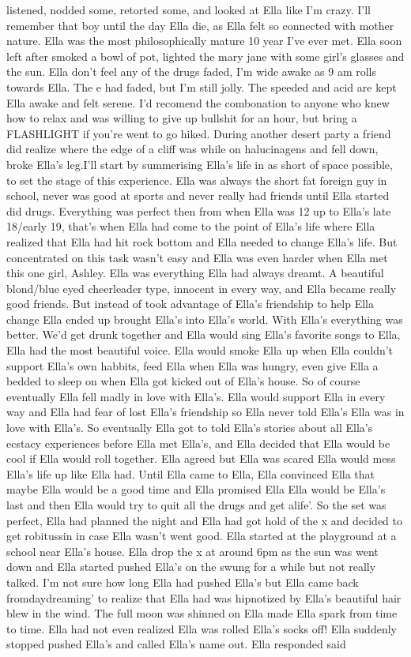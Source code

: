 \documentclass[12pt]{book}
\begin{document}
listened, nodded some, retorted some, and looked at Ella like I'm crazy. I'll remember that boy until the day Ella die, as Ella felt so connected with mother nature. Ella was the most philosophically mature 10 year I've ever met. Ella soon left after smoked a bowl of pot, lighted the mary jane with some girl's glasses and the sun. Ella don't feel any of the drugs faded, I'm wide awake as 9 am rolls towards Ella. The e had faded, but I'm still jolly. The speeded and acid are kept Ella awake and felt serene. I'd recomend the combonation to anyone who knew how to relax and was willing to give up bullshit for an hour, but bring a FLASHLIGHT if you're went to go hiked. During another desert party a friend did realize where the edge of a cliff was while on halucinagens and fell down, broke Ella's leg.I'll start by summerising Ella's life in as short of space possible, to set the stage of this experience. Ella was always the short fat foreign guy in school, never was good at sports and never really had friends until Ella started did drugs. Everything was perfect then from when Ella was 12 up to Ella's late 18/early 19, that's when Ella had come to the point of Ella's life where Ella realized that Ella had hit rock bottom and Ella needed to change Ella's life. But concentrated on this task wasn't easy and Ella was even harder when Ella met this one girl, Ashley. Ella was everything Ella had always dreamt. A beautiful blond/blue eyed cheerleader type, innocent in every way, and Ella became really good friends. But instead of took advantage of Ella's friendship to help Ella change Ella ended up brought Ella's into Ella's world. With Ella's everything was better. We'd get drunk together and Ella would sing Ella's favorite songs to Ella, Ella had the most beautiful voice. Ella would smoke Ella up when Ella couldn't support Ella's own habbits, feed Ella when Ella was hungry, even give Ella a bedded to sleep on when Ella got kicked out of Ella's house. So of course eventually Ella fell madly in love with Ella's. Ella would support Ella in every way and Ella had fear of lost Ella's friendship so Ella never told Ella's Ella was in love with Ella's. So eventually Ella got to told Ella's stories about all Ella's ecstacy experiences before Ella met Ella's, and Ella decided that Ella would be cool if Ella would roll together. Ella agreed but Ella was scared Ella would mess Ella's life up like Ella had. Until Ella came to Ella, Ella convinced Ella that maybe Ella would be a good time and Ella promised Ella Ella would be Ella's last and then Ella would try to quit all the drugs and get alife'. So the set was perfect, Ella had planned the night and Ella had got hold of the x and decided to get robitussin in case Ella wasn't went good. Ella started at the playground at a school near Ella's house. Ella drop the x at around 6pm as the sun was went down and Ella started pushed Ella's on the swung for a while but not really talked. I'm not sure how long Ella had pushed Ella's but Ella came back fromdaydreaming' to realize that Ella had was hipnotized by Ella's beautiful hair blew in the wind. The full moon was shinned on Ella made Ella spark from time to time. Ella had not even realized Ella was rolled Ella's socks off! Ella suddenly stopped pushed Ella's and called Ella's name out. Ella responded said 
\end{document}
